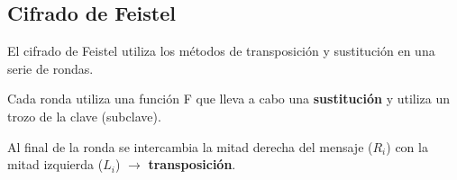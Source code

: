  \subsection{Cifrado de Feistel}
 
 El cifrado de Feistel utiliza los métodos de transposición y sustitución en una serie de rondas.
 
 Cada ronda utiliza una función F que lleva a cabo una \textbf{sustitución} y utiliza un trozo de la clave (subclave).
 
 Al final de la ronda se intercambia la mitad derecha del mensaje ($R_i$) con la mitad izquierda ($L_i$) $\rightarrow $ \textbf{transposición}.
 
 
 
 